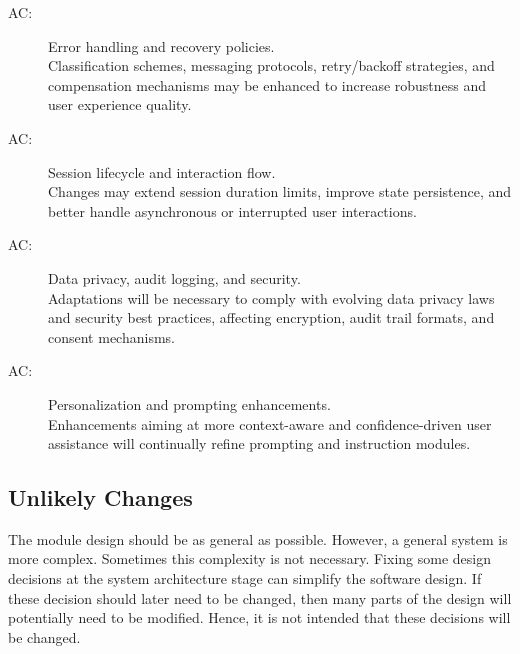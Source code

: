 \documentclass[12pt, titlepage]{article}
\newcounter{acnum}
\newcommand{\actheacnum}{AC\theacnum}
\begin{document}
\begin{description}
\item[ \actheacnum \label{acErrorHandling}:]
Error handling and recovery policies. \\
Classification schemes, messaging protocols, retry/backoff strategies, and compensation mechanisms may be enhanced to increase robustness and user experience quality.

\item[ \actheacnum \label{acSessionManagement}:]
Session lifecycle and interaction flow. \\
Changes may extend session duration limits, improve state persistence, and better handle asynchronous or interrupted user interactions.

\item[ \actheacnum \label{acDataPrivacyLogging}:]
Data privacy, audit logging, and security. \\
Adaptations will be necessary to comply with evolving data privacy laws and security best practices, affecting encryption, audit trail formats, and consent mechanisms.

\item[ \actheacnum \label{acPersonalizationLayer}:]
Personalization and prompting enhancements. \\
Enhancements aiming at more context-aware and confidence-driven user assistance will continually refine prompting and instruction modules.

\end{description}


\subsection{Unlikely Changes} \label{SecUchange}

The module design should be as general as possible. However, a general system is
more complex. Sometimes this complexity is not necessary. Fixing some design
decisions at the system architecture stage can simplify the software design. If
these decision should later need to be changed, then many parts of the design
will potentially need to be modified. Hence, it is not intended that these
decisions will be changed.
\end{document}
